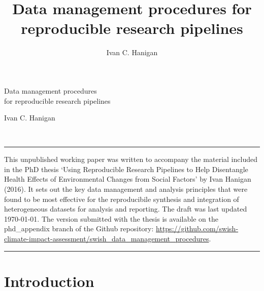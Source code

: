 \documentclass[11pt,a4paper]{article}
\title{Data management procedures for \\ reproducible research pipelines}
\author{
Ivan C. Hanigan
}
\date{}
\renewenvironment{abstract}{
  \hfill\begin{minipage}{1\textwidth}
  \rule{\textwidth}{1pt}\vspace{5pt}
  \normalsize
  \begin{justify}
  \bfseries\abstractname\vspace{5pt}
  \end{justify}}
  {\par\noindent\rule{\textwidth}{1pt}\end{minipage}
}
\begin{document}
\begin{singlespace}
\begin{center}
\huge Data management procedures \\ for reproducible research pipelines
\end{center}
\begin{center}
\large Ivan C. Hanigan
\end{center}
\begin{justify}
\footnotesize \emph{ 
}
\setcounter{num}{1}
\\[0.1cm]
\footnotesize \emph{ 
}
\end{justify}
\normalsize

\begin{abstract}
This unpublished working paper was written to accompany the material included in the PhD thesis `Using Reproducible Research Pipelines to Help Disentangle Health Effects of Environmental Changes from Social Factors' by Ivan Hanigan (2016). It sets out the key data management and analysis principles that were found to be most effective for the reproducibile synthesis and integration of
heterogeneous datasets for analysis and reporting. The draft was last updated \today. The version submitted with the thesis is available on the phd\_appendix branch of the Github repository: \url{https://github.com/swish-climate-impact-assessment/swish_data_management_procedures}.
\end{abstract}
\end{singlespace}

{
\hypersetup{linkcolor=black}
\setcounter{tocdepth}{2}
\tableofcontents
}

\clearpage

\section{Introduction}\label{introduction}
\end{document}
